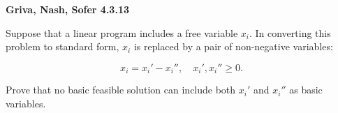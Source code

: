\textbf{Griva, Nash, Sofer 4.3.13}

Suppose that a linear program includes a free variable $x_i$. In converting this problem to standard form, $x_i$ is
replaced by a pair of non-negative variables:

$$
x_i = x_i' - x_i'', \quad x_i', x_i'' \geq 0.
$$

Prove that no basic feasible solution can include both $x_i'$ and $x_i''$ as basic variables.

\begin{solution}
  \ \\
  \vfill
  \ \\
\end{solution}